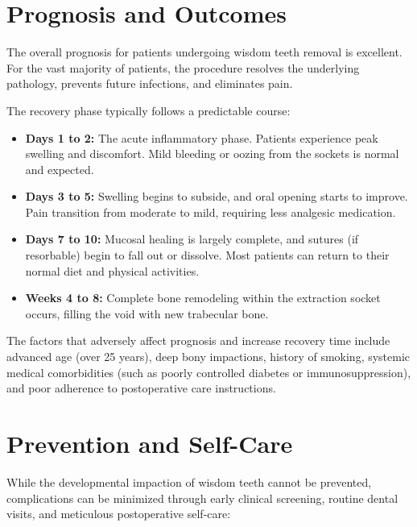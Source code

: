 \section*{Prognosis and Outcomes}
The overall prognosis for patients undergoing wisdom teeth removal is excellent. For the vast majority of patients, the procedure resolves the underlying pathology, prevents future infections, and eliminates pain.

The recovery phase typically follows a predictable course:
\begin{itemize}
    \item \textbf{Days 1 to 2:} The acute inflammatory phase. Patients experience peak swelling and discomfort. Mild bleeding or oozing from the sockets is normal and expected.
    \item \textbf{Days 3 to 5:} Swelling begins to subside, and oral opening starts to improve. Pain transition from moderate to mild, requiring less analgesic medication.
    \item \textbf{Days 7 to 10:} Mucosal healing is largely complete, and sutures (if resorbable) begin to fall out or dissolve. Most patients can return to their normal diet and physical activities.
    \item \textbf{Weeks 4 to 8:} Complete bone remodeling within the extraction socket occurs, filling the void with new trabecular bone.
\end{itemize}

The factors that adversely affect prognosis and increase recovery time include advanced age (over 25 years), deep bony impactions, history of smoking, systemic medical comorbidities (such as poorly controlled diabetes or immunosuppression), and poor adherence to postoperative care instructions.

\section*{Prevention and Self-Care}
While the developmental impaction of wisdom teeth cannot be prevented, complications can be minimized through early clinical screening, routine dental visits, and meticulous postoperative self-care:

